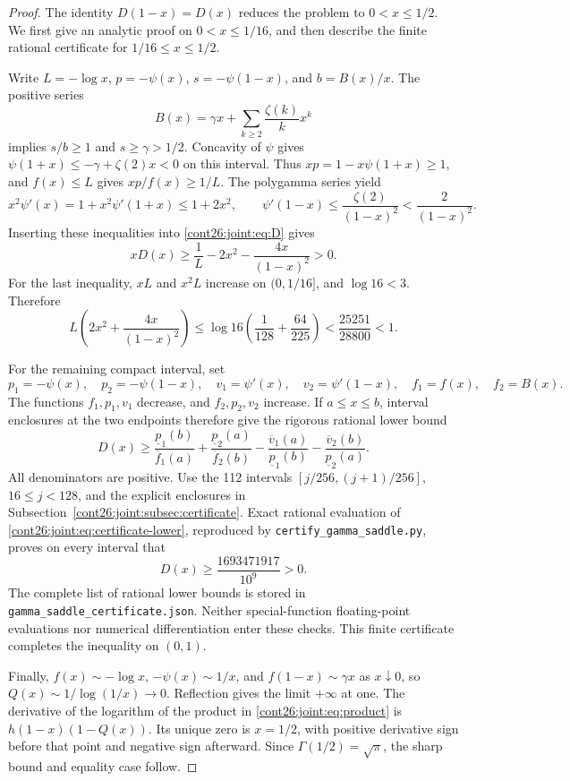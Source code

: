\begin{proof}
The identity $D(1-x)=D(x)$ reduces the problem to $0<x\le1/2$.
We first give an analytic proof on $0<x\le1/16$, and then describe the
finite rational certificate for $1/16\le x\le1/2$.

Write $L=-\log x$, $p=-\psi(x)$, $s=-\psi(1-x)$, and
$b=B(x)/x$.  The positive series
\[
 B(x)=\gamma x+\sum_{k\ge2}\frac{\zeta(k)}k x^k
\]
implies $s/b\ge1$ and $s\ge\gamma>1/2$.
Concavity of $\psi$ gives
$\psi(1+x)\le-\gamma+\zeta(2)x<0$ on this interval.
Thus $xp=1-x\psi(1+x)\ge1$, and $f(x)\le L$ gives
$xp/f(x)\ge1/L$.  The polygamma series yield
\[
 x^2\psi'(x)=1+x^2\psi'(1+x)\le1+2x^2,
 \qquad \psi'(1-x)\le\frac{\zeta(2)}{(1-x)^2}
 <\frac2{(1-x)^2}.
\]
Inserting these inequalities into \eqref{cont26:joint:eq:D} gives
\begin{equation}\label{cont26:joint:eq:endpoint-D}
 xD(x)\ge\frac1L-2x^2-\frac{4x}{(1-x)^2}>0.
\end{equation}
For the last inequality, $xL$ and $x^2L$ increase on $(0,1/16]$,
and $\log16<3$.  Therefore
\[
 L\left(2x^2+\frac{4x}{(1-x)^2}\right)
 \le\log16\left(\frac1{128}+\frac{64}{225}\right)
 <\frac{25251}{28800}<1.
\]

For the remaining compact interval, set
\[
 p_1=-\psi(x),\quad p_2=-\psi(1-x),\quad
 v_1=\psi'(x),\quad v_2=\psi'(1-x),\quad f_1=f(x),\quad f_2=B(x).
\]
The functions $f_1,p_1,v_1$ decrease, and $f_2,p_2,v_2$ increase.
If $a\le x\le b$, interval enclosures at the two endpoints therefore give
the rigorous rational lower bound
\begin{equation}\label{cont26:joint:eq:certificate-lower}
 D(x)\ge
 \frac{\underline p_1(b)}{\overline f_1(a)}
 +\frac{\underline p_2(a)}{\overline f_2(b)}
 -\frac{\overline v_1(a)}{\underline p_1(b)}
 -\frac{\overline v_2(b)}{\underline p_2(a)}.
\end{equation}
All denominators are positive.  Use the 112 intervals
$[j/256,(j+1)/256]$, $16\le j<128$, and the explicit enclosures in
Subsection~\ref{cont26:joint:subsec:certificate}.  Exact rational evaluation of
\eqref{cont26:joint:eq:certificate-lower}, reproduced by
\texttt{certify\_gamma\_saddle.py}, proves on every interval that
\begin{equation}\label{cont26:joint:eq:certificate-margin}
 D(x)\ge \frac{1693471917}{10^9}>0.
\end{equation}
The complete list of rational lower bounds is stored in
\texttt{gamma\_saddle\_certificate.json}.  Neither special-function
floating-point evaluations nor numerical differentiation enter these
checks.  This finite certificate completes the inequality on $(0,1)$.

Finally, $f(x)\sim-\log x$, $-\psi(x)\sim1/x$, and
$f(1-x)\sim\gamma x$ as $x\downarrow0$, so
$Q(x)\sim1/\log(1/x)\to0$.  Reflection gives the limit $+\infty$ at
one.  The derivative of the logarithm of the product in
\eqref{cont26:joint:eq:product} is $h(1-x)(1-Q(x))$.
Its unique zero is $x=1/2$, with positive derivative sign before that
point and negative sign afterward.  Since $\Gamma(1/2)=\sqrt\pi$,
the sharp bound and equality case follow.
\end{proof}

